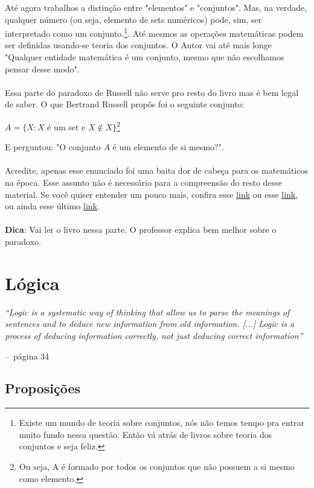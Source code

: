 \documentclass[a4paper,11pt]{book}
\makeatletter
\theoremstyle{definition}
\theoremstyle{break}
\newenvironment{chapquote}[2][2em]
  {\setlength{\@tempdima}{#1}%
   \def\chapquote@author{#2}%
   \parshape 1 \@tempdima \dimexpr\textwidth-2\@tempdima\relax%
   \itshape}
  {\par\normalfont\hfill--\ \chapquote@author\hspace*{\@tempdima}\par\bigskip}
\makeatother
\begin{document}
Até agora trabalhos a distinção entre "elementos" e "conjuntos". Mas, na verdade, qualquer número (ou seja, elemento de sets numéricos) pode, sim, ser interpretado como um conjunto.\footnote{Existe um mundo de teoria sobre conjuntos, nós não temos tempo pra entrar muito fundo nessa questão. Então vá atrás de livros sobre teoria dos conjuntos e seja feliz.}. Até mesmos as operações matemáticas podem ser definidas usando-se teoria dos conjuntos. O Autor vai até mais longe "Qualquer entidade matemática é um conjunto, mesmo que não escolhamos pensar desse modo".
\\
\\
Essa parte do paradoxo de Russell não serve pro resto do livro mas é bem legal de saber. O que Bertrand Russell propôs foi o seguinte conjunto:
\begin{center}
	$ A = \{ X : X $ é um set e $X \notin X \}$\footnote{Ou seja, A é formado por todos os conjuntos que não possuem a si mesmo como elemento.}
\end{center}
E perguntou: "O conjunto $A$ é um elemento de si mesmo?".
\\
\\
Acredite, apenas esse enunciado foi uma baita dor de cabeça para os matemáticos na época. Esse assunto não é necessário para a compreensão do resto desse material. Se você quiser entender um pouco mais, confira esse \href{https://www.youtube.com/watch?v=AQTTYAM8BF0}{link} ou esse \href{https://www.youtube.com/watch?v=0Bs0lJRxOaI}{link}, ou ainda esse último \href{https://www.youtube.com/watch?v=HeQX2HjkcNo}{link}.
\\
\\
\textbf{Dica}: Vai ler o livro nessa parte. O professor explica bem melhor sobre o paradoxo.

\chapter{Lógica}

\begin{chapquote}{página 34}
	``Logic is a systematic way of thinking that allow us to parse the meanings of sentences and to deduce new information from old information. [...] Logic is  a process of deducing information correctly, not just deducing correct information''
\end{chapquote}

\section{Proposições}
\end{document}
